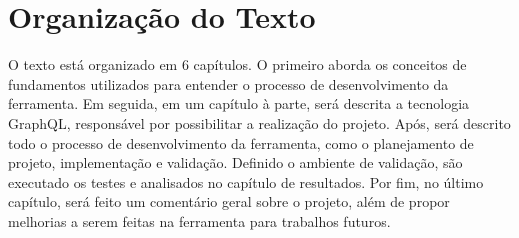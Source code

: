 \section[Organização do Texto]{Organização do Texto}

O texto está organizado em 6 capítulos. O primeiro aborda os conceitos de fundamentos utilizados para entender o processo de desenvolvimento da ferramenta. Em seguida, em um capítulo à parte, será descrita a tecnologia GraphQL, responsável por possibilitar a realização do projeto. Após, será descrito todo o processo de desenvolvimento da ferramenta, como o planejamento de projeto, implementação e validação. Definido o ambiente de validação, são executado os testes e analisados no capítulo de resultados. Por fim, no último capítulo, será feito um comentário geral sobre o projeto, além de propor melhorias a serem feitas na ferramenta para trabalhos futuros.
